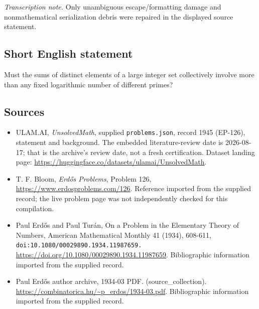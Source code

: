 \documentclass[11pt,a4paper]{article}
\begin{document}
{\small\emph{Transcription note.} Only unambiguous escape/formatting damage and nonmathematical serialization debris were repaired in the displayed source statement.}

\subsection{Short English statement}

Must the sums of distinct elements of a large integer set collectively involve more than any fixed logarithmic number of different primes?

\subsection{Sources}

{\small

\begin{itemize}

\item[\hypertarget{source:1945:1}{S1}] ULAM.AI, \emph{UnsolvedMath}, supplied \texttt{problems.json}, record 1945 (EP-126), statement and background. The embedded literature-review date is 2026-08-17; that is the archive’s review date, not a fresh certification. Dataset landing page: \url{https://huggingface.co/datasets/ulamai/UnsolvedMath}.

\item[\hypertarget{source:1945:2}{S2}] T. F. Bloom, \emph{Erdős Problems}, Problem 126, \url{https://www.erdosproblems.com/126}. Reference imported from the supplied record; the live problem page was not independently checked for this compilation.

\item[\hypertarget{source:1945:3}{S3}] Paul Erdős and Paul Turán, On a Problem in the Elementary Theory of Numbers, American Mathematical Monthly 41 (1934), 608-611, \nolinkurl{doi:10.1080/00029890.1934.11987659.} \url{https://doi.org/10.1080/00029890.1934.11987659}. Bibliographic information imported from the supplied record.

\item[\hypertarget{source:1945:4}{S4}] Paul Erdős author archive, 1934-03 PDF. (source\_collection). \url{https://combinatorica.hu/~p_erdos/1934-03.pdf}. Bibliographic information imported from the supplied record.

\end{itemize}

}

\label{end:1945}
\end{document}
